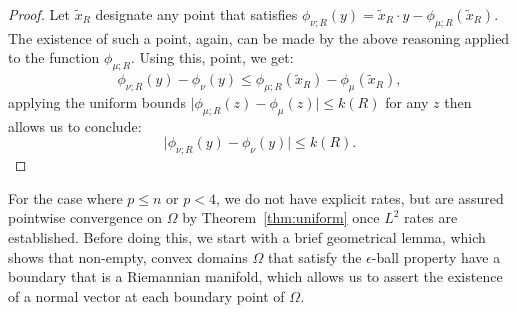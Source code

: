 \documentclass{amsart}
\theoremstyle{lemma}
\theoremstyle{remark}
\begin{document}
\begin{proof}
Let $\tilde{x}_{R}$ designate any point that satisfies $\phi_{\nu;R}(y) = \tilde{x}_{R} \cdot y - \phi_{\mu;R}(\tilde{x}_{R})$. The existence of such a point, again, can be made by the above reasoning applied to the function $\phi_{\mu;R}$. Using this, point, we get:
\begin{equation}
\phi_{\nu;R}(y) - \phi_{\nu}(y) \leq  \phi_{\mu;R}(\tilde{x}_R) - \phi_{\mu}(\tilde{x}_R),
\end{equation}
applying the uniform bounds $\vert \phi_{\mu;R}(z) - \phi_{\mu}(z) \vert \leq k(R)$ for any $z$ then allows us to conclude:
\begin{equation}
\vert \phi_{\nu;R}(y) - \phi_{\nu}(y) \vert \leq  k(R).
\end{equation}
\end{proof}

For the case where $p \leq n$ or $p <4$, we do not have explicit rates, but are assured pointwise convergence on $\Omega$ by Theorem~\ref{thm:uniform} once $L^2$ rates are established. Before doing this, we start with a brief geometrical lemma, which shows that non-empty, convex domains $\Omega$ that satisfy the $\epsilon$-ball property have a boundary that is a Riemannian manifold, which allows us to assert the existence of a normal vector at each boundary point of $\Omega$.
\end{document}
